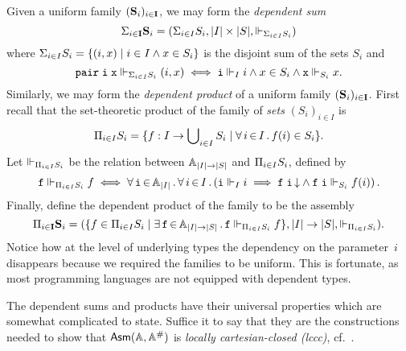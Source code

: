 Given a uniform family $(\mathbf{S}_i)_{i \in \mathbf{I}}$, we may form the
\emph{dependent sum}
%
\begin{equation*}
  \Sigma_{i \in \mathbf{I}} \mathbf{S}_i =
  (\Sigma_{i \in I} S_i, |I| \times |S|, \Vdash_{\Sigma_{i \in I} S_i})
\end{equation*}
%
where $\Sigma_{i \in I} S_i = \{(i,x) \mid i \in I \land x \in
  S_i\}$ is the disjoint sum of the sets $S_i$ and
%
\begin{equation*}
  \mathtt{pair}\;\mathtt{i}\;\mathtt{x} \Vdash_{\Sigma_{i \in I} S_i} (i, x)
  \iff
  \mathtt{i} \Vdash_I i
  \land
  x \in S_i
  \land
  \mathtt{x} \Vdash_{S_i} x.  
\end{equation*}
%
Similarly, we may form the \emph{dependent product} of a uniform
family $(\mathbf{S}_i)_{i \in \mathbf{I}}$. First recall that the
set-theoretic product of the family of \emph{sets} $(S_i)_{i \in I}$
is
%
\begin{equation*}
  \Pi_{i \in I} S_i =
  \{f : I \to \bigcup\nolimits_{i \in I} S_i \mid
    \forall\, i \,{\in}\, I\,.\,f(i) \in S_i
  \}.
\end{equation*}
%
Let $\Vdash_{\Pi_{i \in I} S_i}$ be the relation between $\mathbb{A}_{|I|
  \to |S|}$ and $\Pi_{i \in I} S_i$, defined by
%
\begin{equation*}
  \mathtt{f} \Vdash_{\Pi_{i \in I} S_i} f
  \iff
  \forall\, \mathtt{i} \,{\in}\, \mathbb{A}_{|I|}\,.\,
    \forall\, i \,{\in}\, I\,.\left(
      \mathtt{i} \Vdash_I i
      \implies
      \mathtt{f}\;\mathtt{i}\,{\downarrow} \land
      \mathtt{f}\;\mathtt{i} \Vdash_{S_i} f(i)
    \right)
 .
\end{equation*}
%
Finally, define the dependent product of the family to be the assembly
%
\begin{equation*}
  \Pi_{i \in \mathbf{I}} \mathbf{S}_i =
  (\{f \in \Pi_{i \in I} S_i \mid
    \exists\, \mathtt{f} \,{\in}\, \mathbb{A}_{|I| \to |S|}\,.\,\mathtt{f} \Vdash_{\Pi_{i \in I} S_i}
      f\},
  |I| \to |S|, {\Vdash_{\Pi_{i \in I} S_i}}).
\end{equation*}
%
Notice how at the level of underlying types the dependency on the
parameter~$i$ disappears because we required the families to be
uniform. This is fortunate, as most programming languages are not
equipped with dependent types.

The dependent sums and products have their universal properties which
are somewhat complicated to state. Suffice it to say that they are the
constructions needed to show that $\mathsf{Asm}(\mathbb{A},\mathbb{A}^{\#})$ is \emph{locally
  cartesian-closed (lccc)}, cf.\ \cite{background-lccc}.


%

